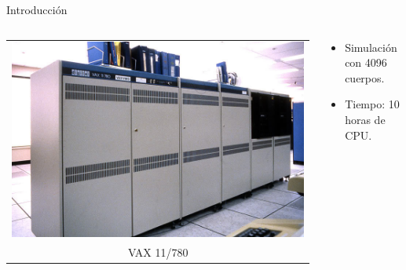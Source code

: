 \documentclass{beamer}
\begin{document}
\begin{frame}{Introducci\'on}
	\begin{columns}
		\begin{column}{.5\textwidth}
			\begin{tabular}{c}
				\includegraphics[width=\textwidth]{sources/images/DEC-VAX-11-780} \\
				VAX 11/780
			\end{tabular}
		\end{column}
		\begin{column}{.5\textwidth}
			\begin{itemize}
				\item<2-> Simulaci\'on con 4096 cuerpos.
				\item<3-> Tiempo: 10 horas de CPU.
			\end{itemize}
		\end{column}
	\end{columns}
\end{frame}
\end{document}
